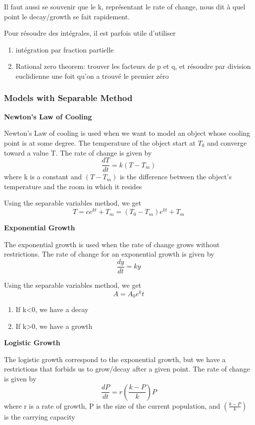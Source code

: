 \documentclass{article}
\begin{document}
Il faut aussi se souvenir que le k, représentant le rate of change, nous
dit à quel point le decay/growth se fait rapidement.

\begin{remark}
    Pour résoudre des intégrales, il est parfois utile d'utiliser
    \begin{enumerate}
        \item intégration par fraction partielle
	\item Rational zero theorem: trouver les facteurs de p et q, et
	    résoudre par division euclidienne une foit qu'on a trouvé le
	    premier zéro
    \end{enumerate}
\end{remark}

\subsubsection{Models with Separable Method}%
\label{ssub:Models with Separable Method}

\textbf{Newton's Law of Cooling}

Newton's Law of cooling is used when we want to model an object whose
cooling point is at some degree. The temperature of the object start at
$T_0$ and converge toward a value T. The rate of change is given by
$$ \frac{dT}{dt}  = k(T-T_m)$$
where k is a constant and $(T - T_m)$ is the difference between the
object's temperature and the room in which it resides

Using the separable variables method, we get $$ T = c e^{kt} + T_m
= (T_0 - T_m) e^{kt} + T_m$$

\textbf{Exponential Growth}

The exponential growth is used when the rate of change grows without
restrictions. The rate of change for an exponential growth is given
by $$ \frac{dy}{dt} = ky $$

Using the separable variables method, we get
$$ A = A_0 e^kt $$

\begin{remark}
    \begin{enumerate}
        \item If k<0, we have a decay
	\item If k>0, we have a growth
    \end{enumerate}
\end{remark}

\textbf{Logistic Growth}

The logistic growth correspond to the exponential growth, but we have
a restrictions that forbids us to grow/decay after a given point.
The rate of change is given by $$ \frac{dP}{dt}  = r (\frac{k-P}{k}) P $$
where r is a rate of growth, P is the size of the current population, and
$(\frac{k-P}{k} )$ is the carrying capacity
\end{document}
